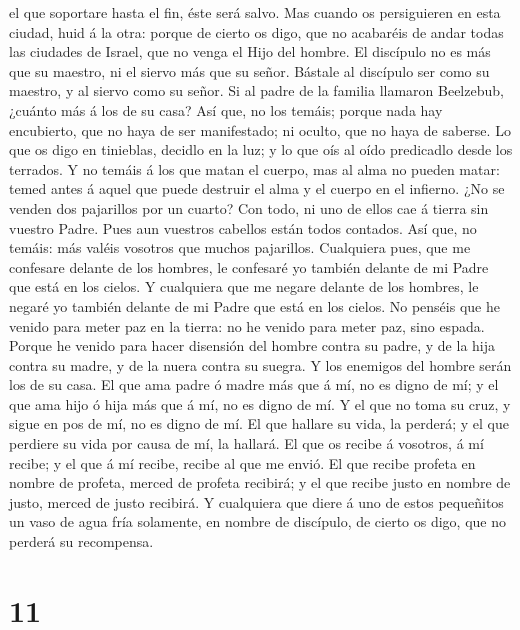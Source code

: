 el que soportare hasta el fin, éste será salvo.  Mas
cuando os persiguieren en esta ciudad, huid á la otra: porque de cierto
os digo, que no acabaréis de andar todas las ciudades de Israel, que no
venga el Hijo del hombre.  El discípulo no es más que su
maestro, ni el siervo más que su señor.  Bástale al
discípulo ser como su maestro, y al siervo como su señor. Si al padre de
la familia llamaron Beelzebub, ¿cuánto más á los de su casa?
 Así que, no los temáis; porque nada hay encubierto, que
no haya de ser manifestado; ni oculto, que no haya de saberse.
 Lo que os digo en tinieblas, decidlo en la luz; y lo que
oís al oído predicadlo desde los terrados.  Y no temáis á
los que matan el cuerpo, mas al alma no pueden matar: temed antes á
aquel que puede destruir el alma y el cuerpo en el infierno.
 ¿No se venden dos pajarillos por un cuarto? Con todo, ni
uno de ellos cae á tierra sin vuestro Padre.  Pues aun
vuestros cabellos están todos contados.  Así que, no
temáis: más valéis vosotros que muchos pajarillos. 
Cualquiera pues, que me confesare delante de los hombres, le confesaré
yo también delante de mi Padre que está en los cielos.  Y
cualquiera que me negare delante de los hombres, le negaré yo también
delante de mi Padre que está en los cielos.  No penséis
que he venido para meter paz en la tierra: no he venido para meter paz,
sino espada.  Porque he venido para hacer disensión del
hombre contra su padre, y de la hija contra su madre, y de la nuera
contra su suegra.  Y los enemigos del hombre serán los de
su casa.  El que ama padre ó madre más que á mí, no es
digno de mí; y el que ama hijo ó hija más que á mí, no es digno de mí.
 Y el que no toma su cruz, y sigue en pos de mí, no es
digno de mí.  El que hallare su vida, la perderá; y el
que perdiere su vida por causa de mí, la hallará.  El que
os recibe á vosotros, á mí recibe; y el que á mí recibe, recibe al que
me envió.  El que recibe profeta en nombre de profeta,
merced de profeta recibirá; y el que recibe justo en nombre de justo,
merced de justo recibirá.  Y cualquiera que diere á uno
de estos pequeñitos un vaso de agua fría solamente, en nombre de
discípulo, de cierto os digo, que no perderá su recompensa.

\hypertarget{section-10}{%
\section{11}\label{section-10}}

